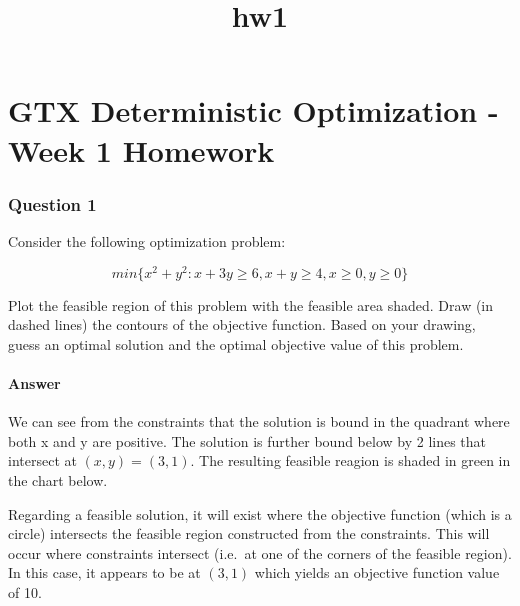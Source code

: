 \documentclass[11pt]{article}
\title{hw1}
\begin{document}
    
    
    \maketitle
    
    

    
    \hypertarget{gtx-deterministic-optimization---week-1-homework}{%
\section{GTX Deterministic Optimization - Week 1
Homework}\label{gtx-deterministic-optimization---week-1-homework}}

    \hypertarget{question-1}{%
\subsubsection{Question 1}\label{question-1}}

Consider the following optimization problem:

\[min \{ x^2 + y^2 : x + 3y \geq 6, x + y \geq 4, x \geq 0, y \geq 0 \}\]

Plot the feasible region of this problem with the feasible area shaded.
Draw (in dashed lines) the contours of the objective function. Based on
your drawing, guess an optimal solution and the optimal objective value
of this problem.

\hypertarget{answer}{%
\paragraph{Answer}\label{answer}}

We can see from the constraints that the solution is bound in the
quadrant where both x and y are positive. The solution is further bound
below by 2 lines that intersect at \((x,y) = (3,1)\). The resulting
feasible reagion is shaded in green in the chart below.

Regarding a feasible solution, it will exist where the objective
function (which is a circle) intersects the feasible region constructed
from the constraints. This will occur where constraints intersect
(i.e.~at one of the corners of the feasible region). In this case, it
appears to be at \((3,1)\) which yields an objective function value of
10.
\end{document}
